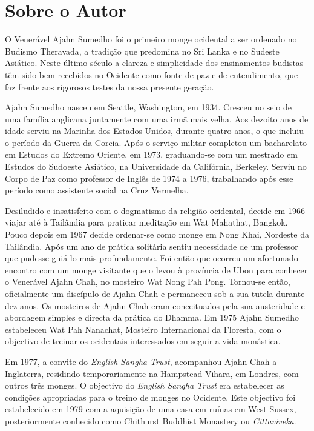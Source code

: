 \chapter{Sobre o Autor}


O Venerável Ajahn Sumedho foi o primeiro monge ocidental a ser ordenado no
Budismo Theravada, a tradição que predomina no Sri Lanka e no Sudeste Asiático.
Neste último século a clareza e simplicidade dos ensinamentos budistas têm sido
bem recebidos no Ocidente como fonte de paz e de entendimento, que faz frente
aos rigorosos testes da nossa presente geração.

Ajahn Sumedho nasceu em Seattle, Washington, em 1934. Cresceu no seio de uma
família anglicana juntamente com uma irmã mais velha. Aos dezoito anos de idade
serviu na Marinha dos Estados Unidos, durante quatro anos, o que incluiu o
período da Guerra da Coreia. Após o serviço militar completou um bacharelato em
Estudos do Extremo Oriente, em 1973, graduando-se com um mestrado em Estudos do
Sudoeste Asiático, na Universidade da Califórnia, Berkeley. Serviu no Corpo de
Paz como professor de Inglês de 1974 a 1976, trabalhando após esse período como
assistente social na Cruz Vermelha.

Desiludido e insatisfeito com o dogmatismo da religião ocidental, decide em 1966
viajar até à Tailândia para praticar meditação em Wat Mahathat, Bangkok. Pouco
depois em 1967 decide ordenar-se como monge em Nong Khai, Nordeste da Tailândia.
Após um ano de prática solitária sentiu necessidade de um professor que pudesse
guiá-lo mais profundamente. Foi então que ocorreu um afortunado encontro com um
monge visitante que o levou à província de Ubon para conhecer o Venerável Ajahn
Chah, no mosteiro Wat Nong Pah Pong. Tornou-se então, oficialmente um discípulo
de Ajahn Chah e permaneceu sob a sua tutela durante dez anos. Os mosteiros de
Ajahn Chah eram conceituados pela sua austeridade e abordagem simples e directa
da prática do Dhamma. Em 1975 Ajahn Sumedho estabeleceu Wat Pah Nanachat,
Mosteiro Internacional da Floresta, com o objectivo de treinar os ocidentais
interessados em seguir a vida monástica.

Em 1977, a convite do \emph{English Sangha Trust}, acompanhou Ajahn Chah a
Inglaterra, residindo temporariamente na Hampstead Vihāra, em Londres, com
outros três monges. O objectivo do \emph{English Sangha Trust} era estabelecer
as condições apropriadas para o treino de monges no Ocidente. Este objectivo foi
estabelecido em 1979 com a aquisição de uma casa em ruínas em West Sussex,
posteriormente conhecido como Chithurst Buddhist Monastery ou
\emph{Cittaviveka}.

